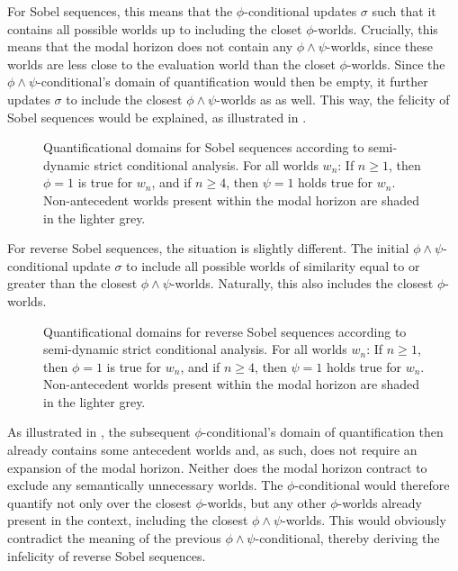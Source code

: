 For Sobel sequences, this means that the $\phi$-conditional updates $\sigma$ such that it contains all possible worlds up to including the closet $\phi$-worlds. Crucially, this means that the modal horizon does not contain any $\phi\land\psi$-worlds, since these worlds are less close to the evaluation world than the closet $\phi$-worlds. Since the $\phi\land\psi$-conditional's domain of quantification would then be empty, it further updates $\sigma$ to include the closest $\phi\land\psi$-worlds as as well. This way, the felicity of Sobel sequences would be explained, as illustrated in .\pagebreak
\begin{figure}[!htb]

\caption{Quantificational domains for Sobel sequences according to  semi-dynamic strict conditional analysis. For all worlds $w_n$: If $n\geqslant1$, then $\phi=1$ is true for $w_n$, and if $n\geqslant 4$, then $\psi=1$ holds true for $w_n$. Non-antecedent worlds present within the modal horizon are shaded in the lighter grey.}
\end{figure}

For reverse Sobel sequences, the situation is slightly different. The initial $\phi\land\psi$-conditional update $\sigma$ to include all possible worlds of similarity equal to or greater than the closest $\phi\land\psi$-worlds. Naturally, this also includes the closest $\phi$-worlds. 

\begin{figure}[!htb]

\caption{Quantificational domains for reverse Sobel sequences according to  semi-dynamic strict conditional analysis. For all worlds $w_n$: If $n\geqslant1$, then $\phi=1$ is true for $w_n$, and if $n\geqslant 4$, then $\psi=1$ holds true for $w_n$. Non-antecedent worlds present within the modal horizon are shaded in the lighter grey.}
\end{figure}
As illustrated in , the subsequent $\phi$-conditional's domain of quantification then already contains some antecedent worlds and, as such, does not require an expansion of the modal horizon. Neither does the modal horizon contract to exclude any semantically unnecessary worlds. The $\phi$-conditional would therefore quantify not only over the closest $\phi$-worlds, but any other $\phi$-worlds already present in the context, including the closest $\phi\land\psi$-worlds. This would obviously contradict the meaning of the previous $\phi\land\psi$-conditional, thereby deriving the infelicity of reverse Sobel sequences.


